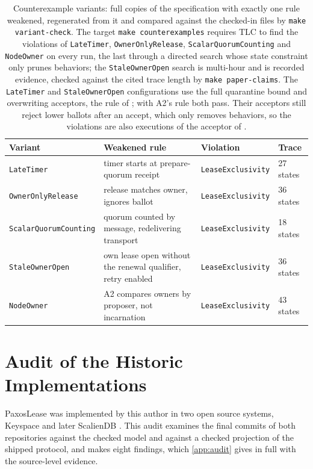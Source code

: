 \documentclass[final,5p,times,twocolumn,number]{elsarticle}
\newcommand{\code}[1]{\texttt{#1}}
\begin{document}
\begin{table}[tbp]
\centering
\small
\renewcommand{\arraystretch}{1.35}
\begin{tabular*}{\textwidth}{@{\extracolsep{\fill}}llll}
\toprule
\textbf{Variant} & \textbf{Weakened rule} & \textbf{Violation} & \textbf{Trace} \\
\midrule[\heavyrulewidth]
\code{LateTimer} & timer starts at prepare-quorum receipt & \code{LeaseExclusivity} & 27 states \\
\hline
\code{OwnerOnlyRelease} & release matches owner, ignores ballot & \code{LeaseExclusivity} & 36 states \\
\hline
\code{ScalarQuorumCounting} & quorum counted by message, redelivering transport & \code{LeaseExclusivity} & 18 states \\
\hline
\code{StaleOwnerOpen} & own lease open without the renewal qualifier, retry enabled & \code{LeaseExclusivity} & 36 states \\
\hline
\code{NodeOwner} & A2 compares owners by proposer, not incarnation & \code{LeaseExclusivity} & 43 states \\
\bottomrule
\end{tabular*}
\caption{\label{tab:variants}Counterexample variants: full copies of the specification with exactly one rule weakened, regenerated from it and compared against the checked-in files by \code{make variant-check}.  The target \code{make counterexamples} requires TLC to find the violations of \code{LateTimer}, \code{OwnerOnlyRelease}, \code{ScalarQuorumCounting} and \code{NodeOwner} on every run, the last through a directed search whose state constraint only prunes behaviors; the \code{StaleOwnerOpen} search is multi-hour and is recorded evidence, checked against the cited trace length by \code{make paper-claims}.  The \code{LateTimer} and \code{StaleOwnerOpen} configurations use the full quarantine bound and overwriting acceptors, the rule of \cite{ref1}; with A2's rule both pass.  Their acceptors still reject lower ballots after an accept, which only removes behaviors, so the violations are also executions of the acceptor of \cite{ref1}.}
\end{table}

\section{Audit of the Historic Implementations}\label{sec:audit}

PaxosLease was implemented by this author in two open source systems, Keyspace \cite{ref14} and later ScalienDB \cite{ref15}.  This audit examines the final commits of both repositories against the checked model and against a checked projection of the shipped protocol, and makes eight findings, which \ref{app:audit} gives in full with the source-level evidence.
\end{document}
